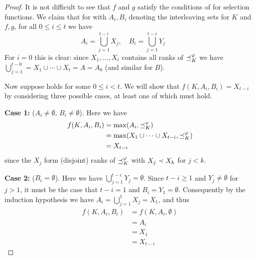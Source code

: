 \begin{proof}

    It is not difficult to see that $f$ and $g$ satisfy the conditions of
     for selection functions. We claim that for
    with $A_i, B_i$ denoting the interleaving sets for $K$ and $f, g$, for
    all $0 \le i \le t$ we have
    \begin{equation}
        \label{tourn_eqn_ai_bi_unions}
        A_i = \bigcup_{j=1}^{t - i}{X_j},
        \quad
        B_i = \bigcup_{j=1}^{t - i}{Y_j}
        \quad
        \quad
    \end{equation}
    For $i = 0$ this is clear: since $X_1,\ldots,X_t$ contains all ranks of
    ${\preceq_K^\varphi}$ we have $\bigcup_{j=1}^{t-0} = X_1 \cup \cdots \cup X_t = A
    = A_0$ (and similar for $B$).

    Now suppose  holds for some $0 \le i < t$. We
    will show that $f(K, A_i, B_i) = X_{t-i}$ by considering three possible
    cases, at least one of which must hold.

    \textbf{Case 1:} ($A_i \ne \emptyset$, $B_i \ne \emptyset$). Here we have
    \begin{align*}
        f(K, A_i, B_i)
        &= \max(A_i, {\preceq_K^\varphi}) \\
        &= \max(X_1 \cup \cdots \cup X_{t-i}, {\preceq_K^\varphi}) \\
        &= X_{t-i}
    \end{align*}
    since the $X_j$ form (disjoint) ranks of ${\preceq_K^\varphi}$ with $X_{j} \prec
    X_{k}$ for $j < k$.

    \textbf{Case 2:} ($B_i = \emptyset$). Here we have
    $\bigcup_{j=1}^{t-i}{Y_j} = \emptyset$. Since $t - i \ge 1$ and $Y_j \ne
    \emptyset$ for $j > 1$, it must be the case that $t - i = 1$ and $B_i = Y_1
    = \emptyset$. Consequently by the induction hypothesis we have $A_i =
    \bigcup_{j=1}^{1}{X_j} = X_1$, and thus
    \begin{align*}
        f(K, A_i, B_i)
        &= f(K, A_i, \emptyset) \\
        &= A_i \\
        &= X_1 \\
        &= X_{t-i}
    \end{align*}


\end{proof}
